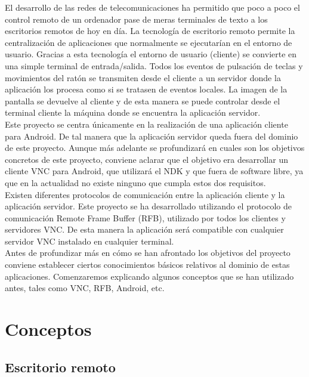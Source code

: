 El desarrollo de las redes de telecomunicaciones ha permitido que poco a poco el control remoto de un ordenador pase de meras terminales de texto a los escritorios remotos de hoy en día. La tecnología de escritorio remoto permite la centralización de aplicaciones que normalmente se ejecutarían en el entorno de usuario. Gracias a esta tecnología el entorno de usuario (cliente) se convierte en una simple terminal de entrada/salida. Todos los eventos de pulsación de teclas y movimientos del ratón se transmiten desde el cliente a un servidor donde la aplicación los procesa como si se tratasen de eventos locales. La imagen de la pantalla se devuelve al cliente y de esta manera se puede controlar desde el terminal cliente la máquina donde se encuentra la aplicación servidor.\\

Este proyecto se centra únicamente en la realización de una aplicación cliente para Android. De tal manera que la aplicación servidor queda fuera del dominio de este proyecto. Aunque más adelante se profundizará en cuales son los objetivos concretos de este proyecto, conviene aclarar que el objetivo era desarrollar un cliente VNC para Android, que utilizará el NDK y que fuera de software libre, ya que en la actualidad no existe ninguno que cumpla estos dos requisitos.\\

Existen diferentes protocolos de comunicación entre la aplicación cliente y la aplicación servidor. Este proyecto se ha desarrollado utilizando el protocolo de comunicación Remote Frame Buffer (RFB), utilizado por todos los clientes y servidores VNC. De esta manera la aplicación será compatible con cualquier servidor VNC instalado en cualquier terminal.\\

Antes de profundizar más en cómo se han afrontado los objetivos del proyecto conviene establecer ciertos conocimientos básicos relativos al dominio de estas aplicaciones. Comenzaremos explicando algunos conceptos que se han utilizado antes, tales como VNC, RFB, Android, etc.

\section{Conceptos}

\subsection{Escritorio remoto}

